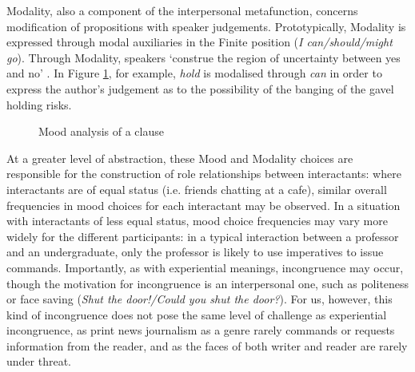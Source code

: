 		Modality, also a component of the interpersonal metafunction, concerns modification of propositions with speaker judgements.
		Prototypically, Modality is expressed through modal auxiliaries in the Finite position (\emph{I can/should/might go}). Through Modality, speakers `construe the region of uncertainty between yes and no' \cite[p.~147]{halliday_introduction_2004}. In Figure \ref{fig:moodannotation}, for example, \emph{hold} is modalised through \emph{can} in order to express the author's judgement as to the possibility of the banging of the gavel holding risks.

			\begin{figure}[htb]
			\centering \footnotesize \onehalfspacing
			\caption{Mood analysis of a clause}
			    			\label{fig:moodannotation}
			\end{figure}


		At a greater level of abstraction, these Mood and Modality choices are responsible for the construction of role relationships between interactants: where interactants are of equal status (i.e. friends chatting at a cafe), similar overall frequencies in mood choices for each interactant may be observed. In a situation with interactants of less equal status, mood choice frequencies may vary more widely for the different participants: in a typical interaction between a professor and an undergraduate, only the professor is likely to use imperatives to issue commands. Importantly, as with experiential meanings, incongruence may occur, though the motivation for incongruence is an interpersonal one, such as politeness or face saving (\emph{Shut the door!/Could you shut the door?}). For us, however, this kind of incongruence does not pose the same level of challenge as experiential incongruence, as print news journalism as a genre rarely commands or requests information from the reader, and as the faces of both writer and reader are rarely under threat.

